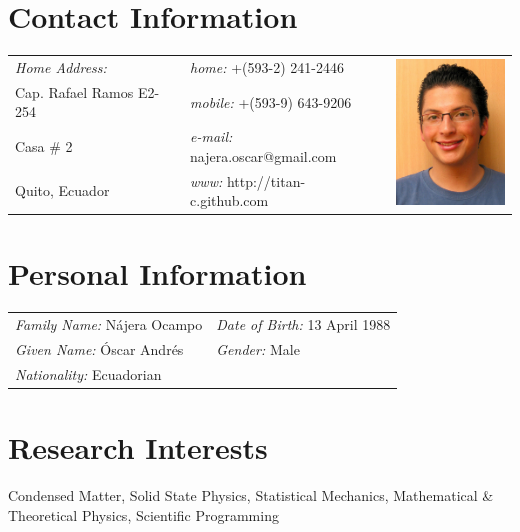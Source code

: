 \documentclass[margin,line]{res}
\begin{document}

\begin{resume}

\section{\sc Contact Information}
  \begin{tabular}{@{}p{2in}p{2.5in}p{3cm} }
    {\it Home Address:}		& {\it home:}  +(593-2) 241-2446 &
      \multirow{4}{*}{ \includegraphics[width=3cm,bb=0 0 500 665]{./foto.jpg}}\\
    Cap. Rafael Ramos E2-254	& {\it mobile:} +(593-9) 643-9206 \\
    Casa \# 2			& {\it e-mail:}  najera.oscar@gmail.com\\
    Quito, Ecuador		& {\it www:} http://titan-c.github.com
  \end{tabular}\vspace{0.5cm}

\section{\sc Personal Information}
 \begin{tabular}{ll}
  {\it Family Name:} Nájera Ocampo & {\it Date of Birth:} 13 April 1988\\
  {\it Given Name:} Óscar Andrés   & {\it Gender:} Male\\
  {\it Nationality:} Ecuadorian    & %
 \end{tabular}

\section{\sc Research Interests}
  Condensed Matter, Solid State Physics, Statistical Mechanics, Mathematical \& Theoretical Physics, Scientific Programming


\end{resume}
\end{document}
